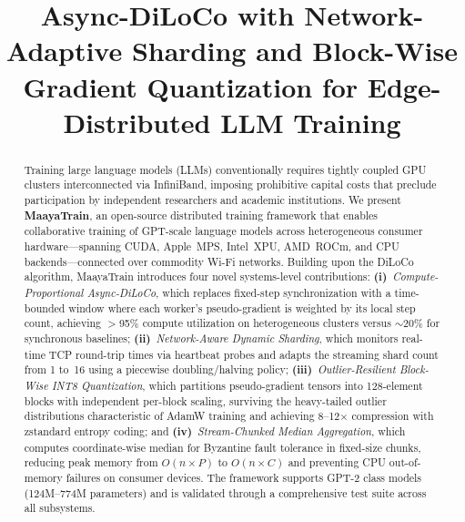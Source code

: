 \documentclass[10pt,conference]{IEEEtran}
\begin{document}
\title{Async-DiLoCo with Network-Adaptive Sharding and Block-Wise\\
Gradient Quantization for Edge-Distributed LLM Training}

\author{
}

\maketitle

\begin{abstract}
Training large language models (LLMs) conventionally requires tightly coupled
GPU clusters interconnected via InfiniBand, imposing prohibitive capital costs
that preclude participation by independent researchers and academic
institutions. We present \textbf{MaayaTrain}, an open-source distributed
training framework that enables collaborative training of GPT-scale language
models across heterogeneous consumer hardware---spanning CUDA, Apple~MPS,
Intel~XPU, AMD~ROCm, and CPU backends---connected over commodity Wi-Fi
networks. Building upon the DiLoCo algorithm, MaayaTrain introduces four
novel systems-level contributions:
\textbf{(i)}~\emph{Compute-Proportional Async-DiLoCo}, which replaces
fixed-step synchronization with a time-bounded window where each worker's
pseudo-gradient is weighted by its local step count, achieving $>$95\%
compute utilization on heterogeneous clusters versus $\sim$20\% for
synchronous baselines;
\textbf{(ii)}~\emph{Network-Aware Dynamic Sharding}, which monitors
real-time TCP round-trip times via heartbeat probes and adapts the streaming
shard count from 1 to~16 using a piecewise doubling/halving policy;
\textbf{(iii)}~\emph{Outlier-Resilient Block-Wise INT8 Quantization}, which
partitions pseudo-gradient tensors into 128-element blocks with independent
per-block scaling, surviving the heavy-tailed outlier distributions
characteristic of AdamW training and achieving 8--12$\times$ compression
with zstandard entropy coding; and
\textbf{(iv)}~\emph{Stream-Chunked Median Aggregation}, which computes
coordinate-wise median for Byzantine fault tolerance in fixed-size chunks,
reducing peak memory from $O(n \times P)$ to $O(n \times C)$ and preventing
CPU out-of-memory failures on consumer devices.
The framework supports GPT-2 class models (124M--774M parameters) and is
validated through a comprehensive test suite across all subsystems.
\end{abstract}
\end{document}
